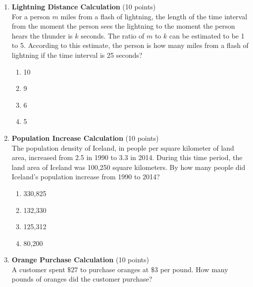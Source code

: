 \begin{enumerate}
  \item \textbf{Lightning Distance Calculation} (10 points)\\
  For a person $m$ miles from a flash of lightning, the length of the time interval from the moment the person sees the lightning to the moment the person hears the thunder is $k$ seconds. The ratio of $m$ to $k$ can be estimated to be 1 to 5. According to this estimate, the person is how many miles from a flash of lightning if the time interval is 25 seconds?
  \begin{enumerate}[label=(\Alph*)]
    \item 10
    \item 9
    \item 6
    \item 5
  \end{enumerate}
  \begin{subanswer}
  \end{subanswer}

  \item \textbf{Population Increase Calculation} (10 points)\\
  The population density of Iceland, in people per square kilometer of land area, increased from 2.5 in 1990 to 3.3 in 2014. During this time period, the land area of Iceland was 100,250 square kilometers. By how many people did Iceland's population increase from 1990 to 2014?
  \begin{enumerate}[label=(\Alph*)]
    \item 330,825
    \item 132,330
    \item 125,312
    \item 80,200
  \end{enumerate}
  \begin{subanswer}
  \end{subanswer}

  \item \textbf{Orange Purchase Calculation} (10 points)\\
  A customer spent $\$ 27$ to purchase oranges at $\$ 3$ per pound. How many pounds of oranges did the customer purchase?
  \begin{subanswer}
  \end{subanswer}


\end{enumerate}
